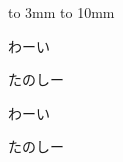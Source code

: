 \documentclass[b5j,tombow]{jarticle}
\begin{document}
\vbox to 3mm{\vskip-36mm
  \hbox to 10mm{\hskip143mm
    \hss}
  \vss}

わーい

たのしー

わーい

たのしー
\end{document}
